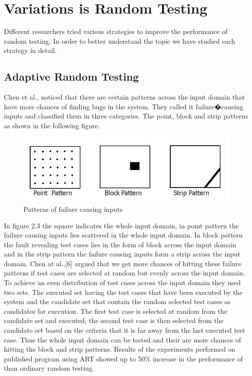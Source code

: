 \section{Variations is Random Testing}
Different researchers tried various strategies to improve the performance of random testing. In order to better understand the topic we have studied each strategy in detail.

\subsection{Adaptive Random Testing}
Chen et al., \cite{Chan1996} noticed that there are certain patterns across the input domain that have more chances of finding bugs in the system. They called it failure�causing inputs and classified them in three categories. The point, block and strip patterns as shown in the following figure.


\begin{figure}[h]
	\centering
	\includegraphics[scale=0.5]{Literature/pointblockstrip}
	\caption{Patterns of failure causing inputs}
\end{figure}

In figure 2.3 the square indicates the whole input domain, in point pattern the failure causing inputs lies scattered in the whole input domain. In block pattern the fault revealing test cases lies in the form of block across the input domain and in the strip pattern the failure causing inputs form a strip across the input domain.
Chen at al.,[6] argued that we get more chances of hitting these failure patterns if test cases are selected at random but evenly across the input domain. To achieve an even distribution of test cases across the input domain they used two sets. The executed set having the test cases that have been executed by the system and the candidate set that contain the random selected test cases as candidates for execution. The first test case is selected at random from the candidate set and executed, the second test case is then selected from the candidate set based on the criteria that it is far away from the last executed test case. Thus the whole input domain can be tested and their are more chances of hitting the block and strip patterns. Results of the experiments performed on published program using ART showed up to 50\% increase in the performance of than ordinary random testing.

